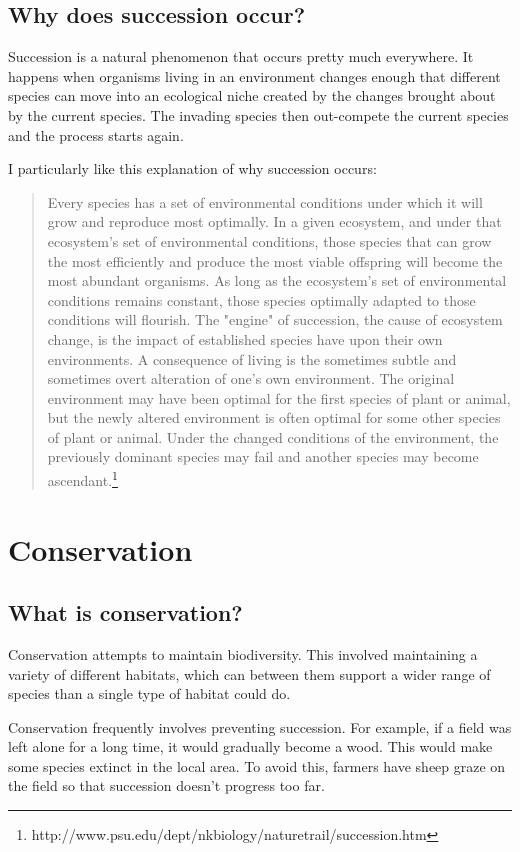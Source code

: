 \documentclass{article}
\begin{document}
\subsection*{Why does succession occur?}
Succession is a natural phenomenon that occurs pretty much everywhere. It happens when organisms living in an environment changes enough that different species can move into an ecological niche created by the changes brought about by the current species. The invading species then out-compete the current species and the process starts again.

I particularly like this explanation of why succession occurs:

\begin{quotation}	
	Every species has a set of environmental conditions under which it will grow and reproduce most optimally. In a given ecosystem, and under that ecosystem's set of environmental conditions, those species that can grow the most efficiently and produce the most viable offspring will become the most abundant organisms. As long as the ecosystem's set of environmental conditions remains constant, those species optimally adapted to those conditions will flourish. The "engine" of succession, the cause of ecosystem change, is the impact of established species have upon their own environments. A consequence of living is the sometimes subtle and sometimes overt alteration of one's own environment. The original environment may have been optimal for the first species of plant or animal, but the newly altered environment is often optimal for some other species of plant or animal. Under the changed conditions of the environment, the previously dominant species may fail and another species may become ascendant.\footnote{http://www.psu.edu/dept/nkbiology/naturetrail/succession.htm}
\end{quotation}

\section*{Conservation}
\subsection*{What is conservation?}
Conservation attempts to maintain biodiversity. This involved maintaining a variety of different habitats, which can between them support a wider range of species than a single type of habitat could do.

Conservation frequently involves preventing succession. For example, if a field was left alone for a long time, it would gradually become a wood. This would make some species extinct in the local area. To avoid this, farmers have sheep graze on the field so that succession doesn't progress too far.
\end{document}
